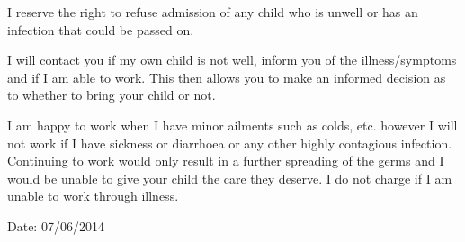 I reserve the right to refuse admission of any child who is unwell or
has an infection that could be passed on.

I will contact you if my own child is not well, inform you of the
illness/symptoms and if I am able to work. This then allows you to make
an informed decision as to whether to bring your child or not.

I am happy to work when I have minor ailments such as colds, etc.
however I will not work if I have sickness or diarrhoea or any other
highly contagious infection. Continuing to work would only result in a
further spreading of the germs and I would be unable to give your child
the care they deserve. I do not charge if I am unable to work through
illness.

Date: 07/06/2014


